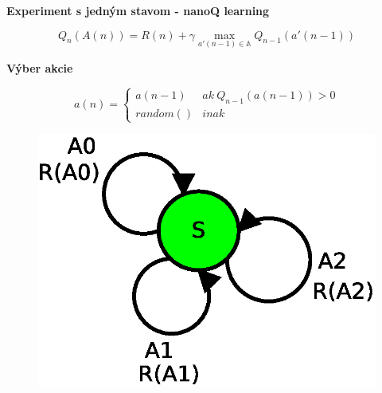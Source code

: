 \documentclass[xcolor=dvipsnames]{beamer}
\begin{document}
\begin{frame}{\bf Experiment s jedným stavom - nanoQ learning}
\begin{minipage}{.5\textwidth}
  \end{minipage}

  \begin{equation}
  Q_n(A(n)) = R(n) + \gamma  \max_{a'(n-1) \in \mathbb{A}} Q_{n-1}(a'(n-1))
  \label{eq:nano_q_func}
  \end{equation}


\end{frame}



\begin{frame}{\bf Výber akcie}

\begin{equation}
a(n) =
\left\{
	\begin{array}{ll}
		a(n-1)  & ak \ Q_{n-1}(a(n-1)) > 0 \\
    random() & inak
	\end{array}
\right.
\label{eq:q_nano_action_selection}
\end{equation}

  \begin{figure}[!htb]
  \centering
  \includegraphics[scale=.5]{../diagrams/single_state.eps}
  \end{figure}
\end{frame}
\end{document}
